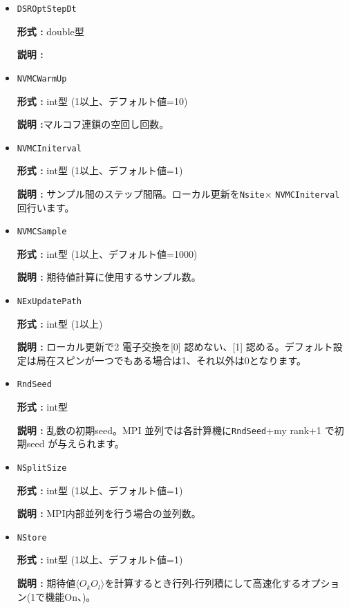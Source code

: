 \begin{itemize}
 {\bf 形式 :} double型 (デフォルト値 = 0.02)

  {\bf 説明 :} SR 法安定化因子。手法論文\cite{Tahara2008}の$\varepsilon$に対応。
     
\item \verb|DSROptStepDt|

{\bf 形式 :} double型 

{\bf 説明 :} 
 
\item \verb|NVMCWarmUp|

{\bf 形式 :} int型 (1以上、デフォルト値=10)

{\bf 説明 :}マルコフ連鎖の空回し回数。

\item \verb|NVMCIniterval|

{\bf 形式 :} int型 (1以上、デフォルト値=1)

{\bf 説明 :} サンプル間のステップ間隔。ローカル更新を\verb|Nsite|× \verb|NVMCIniterval| 回行います。

\item \verb|NVMCSample|

{\bf 形式 :} int型 (1以上、デフォルト値=1000)

{\bf 説明 :} 期待値計算に使用するサンプル数。

\item \verb|NExUpdatePath|

{\bf 形式 :} int型 (1以上)

{\bf 説明 :} ローカル更新で2 電子交換を[0] 認めない、[1] 認める。デフォルト設定は局在スピンが一つでもある場合は1、それ以外は0となります。

\item \verb|RndSeed|

{\bf 形式 :} int型 

{\bf 説明 :} 乱数の初期seed。MPI 並列では各計算機に\verb|RndSeed|+my rank+1 で初期seed が与えられます。

 \item \verb|NSplitSize|

{\bf 形式 :} int型 (1以上、デフォルト値=1)

{\bf 説明 :} MPI内部並列を行う場合の並列数。

\item \verb|NStore|

{\bf 形式 :} int型 (1以上、デフォルト値=1)

{\bf 説明 :} 期待値$\langle O_k O_l \rangle$を計算するとき行列-行列積にして高速化するオプション(1で機能On、)。
 
 \end{itemize}


